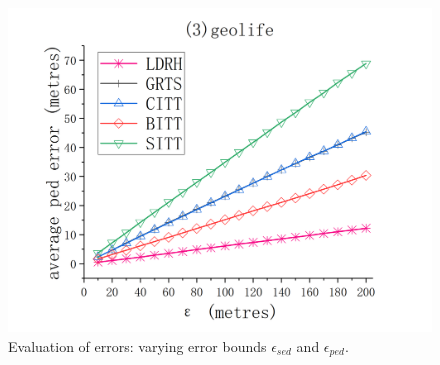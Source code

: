 {\begin{figure}[tb!]
	\includegraphics[scale = 0.560]{figures/Fig-geolife-ped-error.png}\hspace{1ex}
	\vspace{-1ex}
	\caption{\small Evaluation of \ped errors: varying error bounds $\epsilon_{sed}$ and $\epsilon_{ped}$.}
	\label{fig:ped-error}
	\vspace{-1ex}
\end{figure}

}

